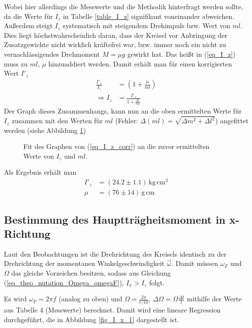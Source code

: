 \documentclass[12pt,a4paper,german]{scrartcl}
\numberwithin{equation}{section}
\begin{document}
  Wobei hier allerdings die Messwerte und die Methodik hinterfragt werden sollte, da die Werte für $I_z$ in Tabelle \ref{table_I_z} signifikant voneinander abweichen.
  Außerdem steigt $I_z$ systematisch mit steigendem Drehimpuls bzw. Wert von $m l$.
  Dies liegt höchstwahrscheinlich daran, dass der Kreisel vor Anbringung der Zusatzgewichte nicht wirklich kräftefrei war, bzw. immer noch ein nicht zu vernachlässigendes Drehmoment $M = \mu g$ gewirkt hat.
  Das heißt in (\ref{eq_I_z}) muss zu $m l$, $\mu$ hinzuaddiert werden. Damit erhält man für einen korrigierten Wert $I'_z$
  \begin{align}
    \frac{I'_z}{I_z} &= \left(1 + \frac{\mu}{m l} \right) \nonumber \\
    \Rightarrow I_z &= \frac{I'_z}{1 + \frac{\mu}{m l}}
    \label{eq_I_z_corr}
  \end{align}
  Der Graph dieses Zusammenhangs, kann nun an die oben ermittelten Werte für $I_z$ zusammen mit den Werten für $m l$ (Fehler: $\Delta (ml) = \sqrt{\Delta m^2 + \Delta l^2}$) angefittet werden (siehe Abbildung \ref{fig_I_z_correction})

  \begin{figure}[H]
    \centering
    
    \caption{Fit des Graphen von (\ref{eq_I_z_corr}) an die zuvor ermittelten Werte von $I_z$ und $m l$.}
    \label{fig_I_z_correction}
  \end{figure}

  Als Ergebnis erhält man
  \begin{align}
    I'_z &= (24.2 \pm 1.1) \, \text{kg} \, \text{cm}^2 \nonumber \\
    \mu &= (76 \pm 14) \, \text{g} \, \text{cm}  
  \end{align}

  \subsection{Bestimmung des Hauptträgheitsmoment in x-Richtung}
  Laut den Beobachtungen ist die Drehrichtung des Kreisels identisch zu der Drehrichtung der momentanen Winkelgeschwindigkeit $\vec{\omega}$.
  Damit müssen $\omega_F$ und $\Omega$ das gleiche Vorzeichen besitzen, sodass aus Gleichung (\ref{eq_theo_nutation_Omega_omegaF}), $I_x > I_z$ folgt.

  Es wird $\omega_F = 2 \pi f$ (analog zu oben) und $\Omega = \frac{2 \pi}{t / 10}$, $\Delta \Omega = \Omega \frac{\Delta t}{t}$ mithilfe der Werte aus Tabelle 4 (Messwerte) berechnet.
  Damit wird eine lineare Regression durchgeführt, die in Abbildung \ref{fig_I_x_1} dargestellt ist.
\end{document}
